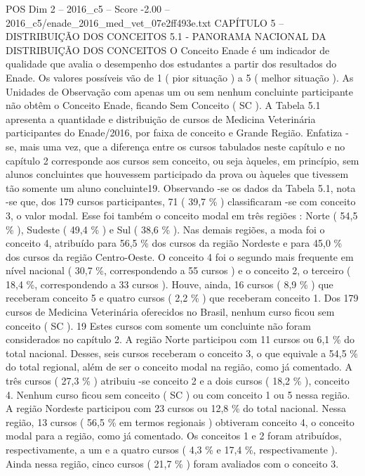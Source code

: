 \begin{textsample}{POS Dim 2 – 2016\_c5 – Score -2.00 – 2016\_c5/enade\_2016\_med\_vet\_07e2ff493e.txt}  \label{ex:f2_pos_397}
CAPÍTULO 5 – DISTRIBUIÇÃO DOS CONCEITOS 5.1 - PANORAMA NACIONAL DA DISTRIBUIÇÃO DOS CONCEITOS O Conceito Enade é um indicador de qualidade que avalia o desempenho dos estudantes a partir dos resultados do Enade.
Os valores possíveis vão de 1 ( pior situação ) a 5 ( melhor situação ).
As Unidades de Observação com apenas um ou sem nenhum concluinte participante não obtêm o Conceito Enade, ficando Sem Conceito ( SC ).
A Tabela 5.1 apresenta a quantidade e distribuição de cursos de Medicina Veterinária participantes do Enade/2016, por faixa de conceito e Grande Região.
Enfatiza -se, mais uma vez, que a diferença entre os cursos tabulados neste capítulo e no capítulo 2 corresponde aos cursos sem conceito, ou seja àqueles, em princípio, sem alunos concluintes que houvessem participado da prova ou àqueles que tivessem tão somente um aluno concluinte19.
Observando -se os dados da Tabela 5.1, nota -se que, dos 179 cursos participantes, 71 ( 39,7 \% ) classificaram -se com conceito 3, o valor modal.
Esse foi também o conceito modal em três regiões : Norte ( 54,5 \% ), Sudeste ( 49,4 \% ) e Sul ( 38,6 \% ).
Nas demais regiões, a moda foi o conceito 4, atribuído para 56,5 \% dos cursos da região Nordeste e para 45,0 \% dos cursos da região Centro-Oeste.
O conceito 4 foi o segundo mais frequente em nível nacional ( 30,7 \%, correspondendo a 55 cursos ) e o conceito 2, o terceiro ( 18,4 \%, correspondendo a 33 cursos ).
Houve, ainda, 16 cursos ( 8,9 \% ) que receberam conceito 5 e quatro cursos ( 2,2 \% ) que receberam conceito 1.
Dos 179 cursos de Medicina Veterinária oferecidos no Brasil, nenhum curso ficou sem conceito ( SC ). 19 Estes cursos com somente um concluinte não foram considerados no capítulo 2.
A região Norte participou com 11 cursos ou 6,1 \% do total nacional.
Desses, seis cursos receberam o conceito 3, o que equivale a 54,5 \% do total regional, além de ser o conceito modal na região, como já comentado.
A três cursos ( 27,3 \% ) atribuiu -se conceito 2 e a dois cursos ( 18,2 \% ), conceito 4.
Nenhum curso ficou sem conceito ( SC ) ou com conceito 1 ou 5 nessa região.
A região Nordeste participou com 23 cursos ou 12,8 \% do total nacional.
Nessa região, 13 cursos ( 56,5 \% em termos regionais ) obtiveram conceito 4, o conceito modal para a região, como já comentado.
Os conceitos 1 e 2 foram atribuídos, respectivamente, a um e a quatro cursos ( 4,3 \% e 17,4 \%, respectivamente ).
Ainda nessa região, cinco cursos ( 21,7 \% ) foram avaliados com o conceito 3.

\end{textsample}
